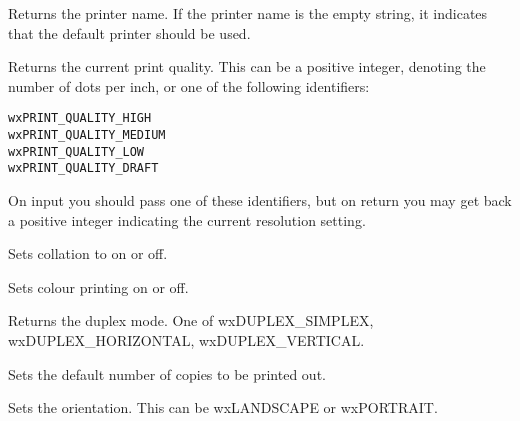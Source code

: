 Returns the printer name. If the printer name is the empty string, it indicates that the default
printer should be used.

\label{wxprintdatagetquality}


Returns the current print quality. This can be a positive integer, denoting the number of dots per inch, or
one of the following identifiers:

\begin{verbatim}
wxPRINT_QUALITY_HIGH
wxPRINT_QUALITY_MEDIUM
wxPRINT_QUALITY_LOW
wxPRINT_QUALITY_DRAFT
\end{verbatim}

On input you should pass one of these identifiers, but on return you may get back a positive integer
indicating the current resolution setting.

\label{wxprintdatasetcollate}


Sets collation to on or off.

\label{wxprintdatasetcolour}


Sets colour printing on or off.

\label{wxprintdatasetduplex}


Returns the duplex mode. One of wxDUPLEX\_SIMPLEX, wxDUPLEX\_HORIZONTAL, wxDUPLEX\_VERTICAL.

\label{wxprintdatasetnocopies}


Sets the default number of copies to be printed out.

\label{wxprintdatasetorientation}


Sets the orientation. This can be wxLANDSCAPE or wxPORTRAIT.

\label{wxprintdatasetpaperid}



